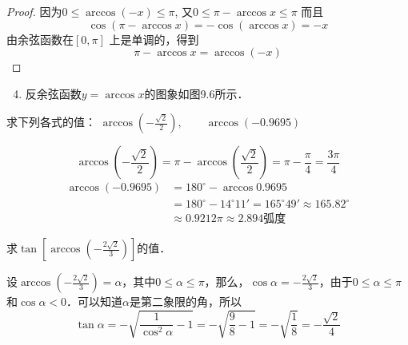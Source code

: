 \begin{proof}
    因为$0\le \arccos(-x)\le \pi$, 又$0\le \pi -\arccos x\le \pi$
而且
\[\cos(\pi -\arccos x)=-\cos(\arccos x)=-x\]
由余弦函数在$[0,\pi]$ 上是单调的，得到
\[\pi -\arccos x=\arccos (-x)\]
\end{proof}

\begin{enumerate}\setcounter{enumi}{3}
\item 反余弦函数$y=\arccos x$的图象如图9.6所示．
\begin{figure}[htp]
    \centering
{}
    \caption{}
\end{figure}
\end{enumerate}

\begin{example}
    求下列各式的值：
$\arccos\left(-\frac{\sqrt{2}}{2}\right),\qquad \arccos(-0.9695)$
\end{example}


\begin{solution}
\[\arccos\left(-\frac{\sqrt{2}}{2}\right)=\pi-\arccos\left(\frac{\sqrt{2}}{2}\right)=\pi-\frac{\pi}{4}=\frac{3\pi}{4}\]
\[\begin{split}
    \arccos(-0.9695)&=180^{\circ}-\arccos0.9695\\
    &=180^{\circ}-14^{\circ}11'=165^{\circ}49'\approx 165.82^{\circ}\\
    &\approx 0.9212\pi\approx 2.894\text{弧度}
\end{split}\]
\end{solution}


\begin{example}
求$\tan\left[\arccos\left(-\frac{2\sqrt{2}}{3}\right)\right]$的值．
\end{example}

\begin{solution}
设$\arccos\left(-\frac{2\sqrt{2}}{3}\right)=\alpha$，其中$0\le \alpha\le \pi$，那么，$\cos\alpha=-\frac{2\sqrt{2}}{3}$，由于$0\le\alpha\le \pi$和$\cos\alpha<0$．可以知道$\alpha$是第二象限的角，所以
\[\tan\alpha=-\sqrt{\frac{1}{\cos^2\alpha}-1}=-\sqrt{\frac{9}{8}-1}=-\sqrt{\frac{1}{8}}=-\frac{\sqrt{2}}{4}\]
\end{solution}


